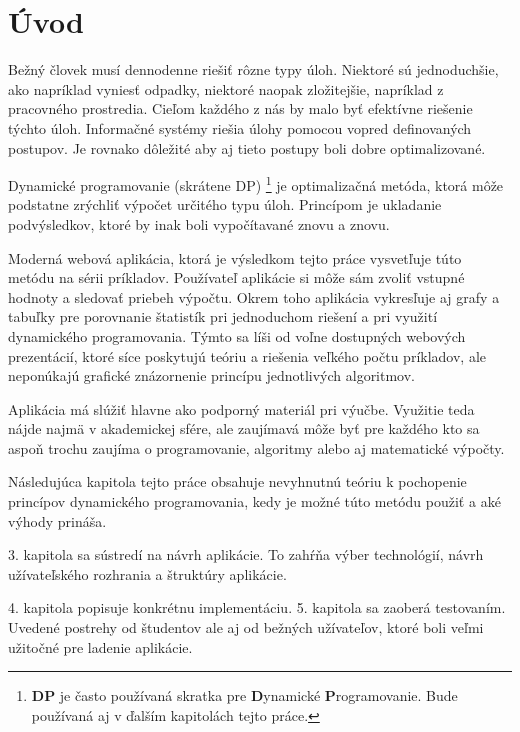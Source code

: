 
\chapter{Úvod}
Bežný človek musí dennodenne riešiť rôzne typy úloh. Niektoré sú jednoduchšie, ako napríklad vyniesť odpadky, niektoré naopak zložitejšie, napríklad z pracovného prostredia. Cieľom každého z nás by malo byť efektívne riešenie týchto úloh. Informačné systémy riešia úlohy pomocou vopred definovaných postupov. Je rovnako dôležité aby aj tieto postupy boli dobre optimalizované. 

Dynamické programovanie (skrátene DP) \footnote{\textbf{DP} je často používaná skratka pre \textbf{D}ynamické \textbf{P}rogramovanie. Bude používaná aj v ďalším kapitolách tejto práce.} je optimalizačná metóda, ktorá môže podstatne zrýchliť výpočet určitého typu úloh. Princípom je ukladanie podvýsledkov, ktoré by inak boli vypočítavané znovu a znovu.

Moderná webová aplikácia, ktorá je výsledkom tejto práce vysvetľuje túto metódu na sérii príkladov. Používateľ aplikácie si môže sám zvoliť vstupné hodnoty a sledovať priebeh výpočtu. Okrem toho aplikácia vykresľuje aj grafy a tabuľky pre porovnanie štatistík pri jednoduchom riešení a pri využití dynamického programovania. Týmto sa líši od voľne dostupných webových prezentácií, ktoré síce poskytujú teóriu a riešenia veľkého počtu príkladov, ale neponúkajú grafické znázornenie princípu jednotlivých algoritmov.

Aplikácia má slúžiť hlavne ako podporný materiál pri výučbe. Využitie teda nájde najmä v akademickej sfére, ale zaujímavá môže byť pre každého kto sa aspoň trochu zaujíma o programovanie, algoritmy alebo aj matematické výpočty.

Následujúca kapitola tejto práce obsahuje nevyhnutnú teóriu k pochopenie princípov dynamického programovania, kedy je možné túto metódu použiť a aké výhody prináša. 

3. kapitola sa sústredí na návrh aplikácie. To zahŕňa výber technológií, návrh užívateľského rozhrania a štruktúry aplikácie. 

4. kapitola popisuje konkrétnu implementáciu. 5. kapitola sa zaoberá testovaním. Uvedené postrehy od študentov ale aj od bežných užívateľov, ktoré boli veľmi užitočné pre ladenie aplikácie.

